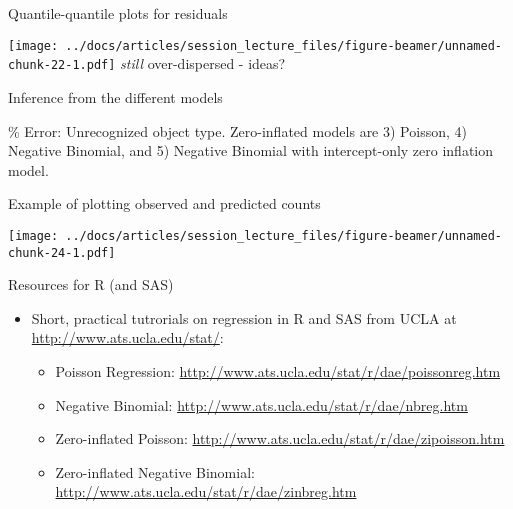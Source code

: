 \documentclass[
  ignorenonframetext,
]{beamer}
\providecommand{\tightlist}{%
  \setlength{\itemsep}{0pt}\setlength{\parskip}{0pt}}
\begin{document}
\begin{frame}{Quantile-quantile plots for residuals}
\protect\hypertarget{quantile-quantile-plots-for-residuals}{}

\texttt{[image: ../docs/articles/session\_lecture\_files/figure-beamer/unnamed-chunk-22-1.pdf]}
\emph{still} over-dispersed - ideas?

\end{frame}

\begin{frame}{Inference from the different models}
\protect\hypertarget{inference-from-the-different-models}{}

\tiny

\% Error: Unrecognized object type. Zero-inflated models are 3) Poisson,
4) Negative Binomial, and 5) Negative Binomial with intercept-only zero
inflation model.

\end{frame}

\begin{frame}{Example of plotting observed and predicted counts}
\protect\hypertarget{example-of-plotting-observed-and-predicted-counts}{}

\texttt{[image: ../docs/articles/session\_lecture\_files/figure-beamer/unnamed-chunk-24-1.pdf]}

\end{frame}

\begin{frame}{Resources for R (and SAS)}
\protect\hypertarget{resources-for-r-and-sas}{}

\begin{itemize}
\tightlist
\item
  Short, practical tutrorials on regression in R and SAS from UCLA at
  \url{http://www.ats.ucla.edu/stat/}:

  \begin{itemize}
  \tightlist
  \item
    Poisson Regression:
    \url{http://www.ats.ucla.edu/stat/r/dae/poissonreg.htm}
  \item
    Negative Binomial:
    \url{http://www.ats.ucla.edu/stat/r/dae/nbreg.htm}
  \item
    Zero-inflated Poisson:
    \url{http://www.ats.ucla.edu/stat/r/dae/zipoisson.htm}
  \item
    Zero-inflated Negative Binomial:
    \url{http://www.ats.ucla.edu/stat/r/dae/zinbreg.htm}
  \end{itemize}
\end{itemize}

\end{frame}
\end{document}
